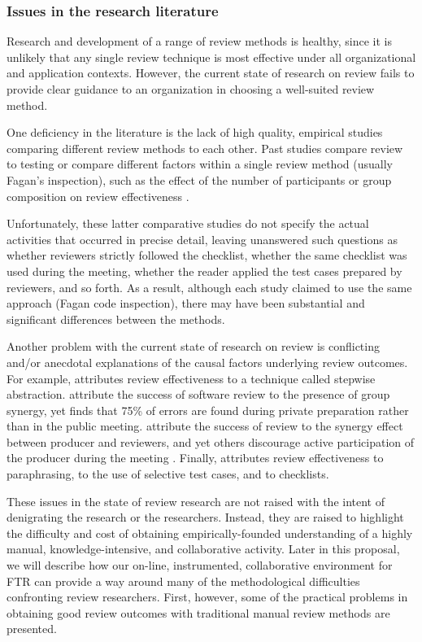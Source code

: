 \subsubsection{Issues in the research literature}

Research and development of a range of review methods is healthy, since it
is unlikely that any single review technique is most effective under all
organizational and application contexts.  However, the current state of
research on review fails to provide clear guidance to an organization in
choosing a well-suited review method.

One deficiency in the literature is the lack of high quality, empirical
studies comparing different review methods to each other.  Past studies
compare review to testing \cite{Myers78,Hetzel76,Basili85} or compare
different factors within a single review method (usually Fagan's
inspection), such as the effect of the number of participants or group
composition on review effectiveness \cite{Bisant89,Martin90}.

Unfortunately, these latter comparative studies do not specify the actual
activities that occurred in precise detail, leaving unanswered such
questions as whether reviewers strictly followed the checklist, whether the
same checklist was used during the meeting, whether the reader applied the
test cases prepared by reviewers, and so forth. As a result, although each
study claimed to use the same approach (Fagan code inspection), there may
have been substantial and significant differences between the methods.

Another problem with the current state of research on review is conflicting
and/or anecdotal explanations of the causal factors underlying review
outcomes.  For example, \cite{Selby85} attributes review effectiveness to a
technique called stepwise abstraction.  \cite{Dunn90,Peele82} attribute the
success of software review to the presence of group synergy, yet
\cite{Humphrey90} finds that 75\% of errors are found during private
preparation rather than in the public meeting.
\cite{Myers78,Parnas85,Peele82} attribute the success of review to the
synergy effect between producer and reviewers, and yet others discourage
active participation of the producer during the meeting
\cite{Ackerman89,Russell91,Pfleeger91}.  Finally, \cite{Fagan76} attributes
review effectiveness to paraphrasing, \cite{Ackerman89} to the use of
selective test cases, and \cite{Knight91} to checklists.

These issues in the state of review research are not raised with the intent
of denigrating the research or the researchers.  Instead, they are raised
to highlight the difficulty and cost of obtaining empirically-founded
understanding of a highly manual, knowledge-intensive, and collaborative
activity.  Later in this proposal, we will describe how our on-line,
instrumented, collaborative environment for FTR can provide a way around
many of the methodological difficulties confronting review researchers.
First, however, some of the practical problems in obtaining good review
outcomes with traditional manual review methods are presented.

